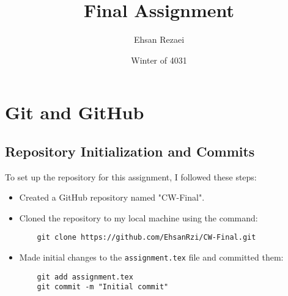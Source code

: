 \documentclass{article}
\title{Final Assignment}
\author{Ehsan Rezaei}
\date{Winter of 4031}
\begin{document}
  
\maketitle  
\tableofcontents  
\section{Git and GitHub}  
\subsection{Repository Initialization and Commits}  
To set up the repository for this assignment, I followed these steps:  
\begin{itemize}  
    \item Created a GitHub repository named "CW-Final".  
    \item Cloned the repository to my local machine using the command:  
    \begin{verbatim}  
    git clone https://github.com/EhsanRzi/CW-Final.git  
    \end{verbatim}  
    \item Made initial changes to the \texttt{assignment.tex} file and committed them:  
    \begin{verbatim}  
    git add assignment.tex  
    git commit -m "Initial commit"  
    \end{verbatim}  
\end{itemize}
\end{document}

